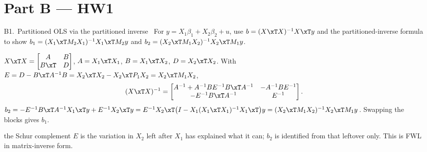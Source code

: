 \section{Part B --- HW1}

\begin{qbox}{B1.\ Partitioned OLS via the partitioned inverse}{\likely\ }
For $y = X_{1}\beta_{1} + X_{2}\beta_{2} + u$, use $b = (X\xT X)^{-1}X\xT y$ and the partitioned-inverse
formula to show $b_{1} = (X_{1}\xT M_{2}X_{1})^{-1}X_{1}\xT M_{2}y$ and
$b_{2} = (X_{2}\xT M_{1}X_{2})^{-1}X_{2}\xT M_{1}y$.
\end{qbox}
\begin{solbox}
 $X\xT X = \begin{bmatrix}A&B\\B\xT&D\end{bmatrix}$, $A=X_{1}\xT X_{1}$, $B=X_{1}\xT X_{2}$, $D=X_{2}\xT X_{2}$.
With $E = D - B\xT A^{-1}B = X_{2}\xT X_{2} - X_{2}\xT P_{1}X_{2} = X_{2}\xT M_{1}X_{2}$,
\[
  (X\xT X)^{-1} = \begin{bmatrix}A^{-1}+A^{-1}BE^{-1}B\xT A^{-1} & -A^{-1}BE^{-1}\\ -E^{-1}B\xT A^{-1} & E^{-1}\end{bmatrix}.
\]
$b_{2} = -E^{-1}B\xT A^{-1}X_{1}\xT y + E^{-1}X_{2}\xT y = E^{-1}X_{2}\xT\big(I-X_{1}(X_{1}\xT X_{1})^{-1}X_{1}\xT\big)y = (X_{2}\xT M_{1}X_{2})^{-1}X_{2}\xT M_{1}y$.
Swapping the blocks gives $b_{1}$.
\begin{why}\Why the Schur complement $E$ is the variation in $X_{2}$ left after $X_{1}$ has explained what it can;
$b_{2}$ is identified from that leftover only. This is FWL in matrix-inverse form.\end{why}
\end{solbox}

